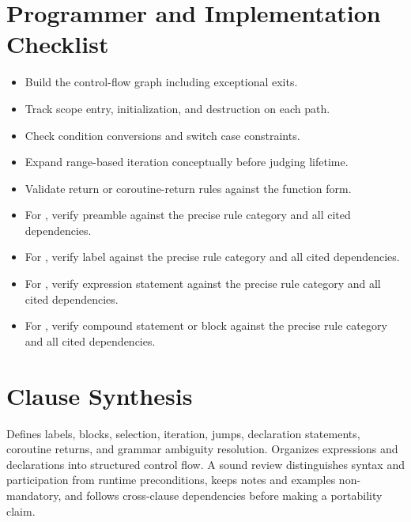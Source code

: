 \documentclass[11pt,letterpaper]{article}
\begin{document}
\section{Programmer and Implementation Checklist}
\begin{CornellReferenceChecklistBox}\begin{itemize}[label=$\square$]
\item Build the control-flow graph including exceptional exits.
\item Track scope entry, initialization, and destruction on each path.
\item Check condition conversions and switch case constraints.
\item Expand range-based iteration conceptually before judging lifetime.
\item Validate return or coroutine-return rules against the function form.
\item For , verify preamble against the precise rule category and all cited dependencies.
\item For , verify label against the precise rule category and all cited dependencies.
\item For , verify expression statement against the precise rule category and all cited dependencies.
\item For , verify compound statement or block against the precise rule category and all cited dependencies.
\end{itemize}\end{CornellReferenceChecklistBox}
\section{Clause Synthesis}
\begin{CornellReferenceOrientationBox}Defines labels, blocks, selection, iteration, jumps, declaration statements, coroutine returns, and grammar ambiguity resolution. Organizes expressions and declarations into structured control flow. A sound review distinguishes syntax and participation from runtime preconditions, keeps notes and examples non-mandatory, and follows cross-clause dependencies before making a portability claim.\end{CornellReferenceOrientationBox}
\end{document}
